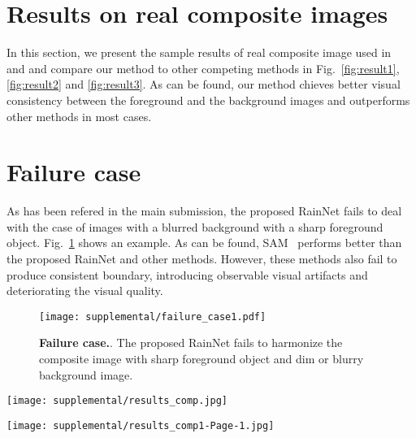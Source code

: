 \documentclass[final]{cvpr}
\begin{document}
\section{Results on real composite images}
\label{sec:real_composite_results}
In this section, we present the sample results of real composite image used in~\cite{tsai2017deep} and \cite{cong2020dovenet} and compare our method to other competing methods in Fig.~\ref{fig:result1}, \ref{fig:result2} and \ref{fig:result3}. As can be found, our method chieves better visual consistency between the foreground and the background images and outperforms other methods in most cases. 


\section{Failure case}
\label{sec:failure_cases}
As has been refered in the main submission, the proposed RainNet fails to deal with the case of images with a blurred background with a sharp foreground object. Fig.~\ref{fig:failure_cases} shows an example. As can be found, SAM~\cite{cun2020improving} performs better than the proposed RainNet and other methods. However, these methods also fail to produce consistent boundary, introducing observable visual artifacts and deteriorating the visual quality. 

\begin{figure}
\begin{center}
\texttt{[image: supplemental/failure\_case1.pdf]}
\end{center}
   \caption{\textbf{Failure case.}. The proposed RainNet fails to harmonize the composite image with sharp foreground object and dim or blurry background image. }
   \label{fig:failure_cases}
\end{figure}


\begin{figure*}
\begin{center}
\texttt{[image: supplemental/results\_comp.jpg]}
\end{center}
   \caption{\textbf{Example results on real composite images.}. We present real composite images, foreground mask, three state-of-the-art methods, and the proposed model. The samples are taken from the testing dataset of~\cite{tsai2017deep}. Our method achieves better harmonized visual results than competing methods. }
   \label{fig:result1}
\end{figure*}


\begin{figure*}
\begin{center}
\texttt{[image: supplemental/results\_comp1-Page-1.jpg]}
\end{center}
   \caption{\textbf{Example results on real composite images.}. We present real composite images, foreground mask, three state-of-the-art methods, and the proposed model. The samples are taken from the testing dataset of~\cite{tsai2017deep}. Our method achieves better harmonized visual results than competing methods. }
   \label{fig:result2}
\end{figure*}
\end{document}
